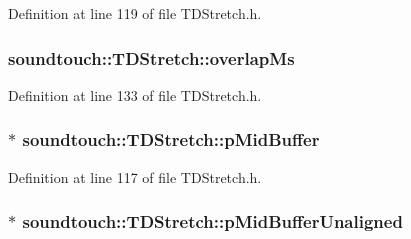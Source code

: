 Definition at line 119 of file T\+D\+Stretch.\+h.

\subsubsection[{\texorpdfstring{overlap\+Ms}{overlapMs}}]{ soundtouch\+::\+T\+D\+Stretch\+::overlap\+Ms\hspace{0.3cm}{\ttfamily [protected]}}\hypertarget{classsoundtouch_1_1_t_d_stretch_a8c3185aed01ad4714c68ef0f3947769d}{}\label{classsoundtouch_1_1_t_d_stretch_a8c3185aed01ad4714c68ef0f3947769d}


Definition at line 133 of file T\+D\+Stretch.\+h.

\subsubsection[{\texorpdfstring{p\+Mid\+Buffer}{pMidBuffer}}]{$\ast$ soundtouch\+::\+T\+D\+Stretch\+::p\+Mid\+Buffer\hspace{0.3cm}{\ttfamily [protected]}}\hypertarget{classsoundtouch_1_1_t_d_stretch_ae8ecce9c1a28ac0e281413ab2d1ffff8}{}\label{classsoundtouch_1_1_t_d_stretch_ae8ecce9c1a28ac0e281413ab2d1ffff8}


Definition at line 117 of file T\+D\+Stretch.\+h.

\subsubsection[{\texorpdfstring{p\+Mid\+Buffer\+Unaligned}{pMidBufferUnaligned}}]{$\ast$ soundtouch\+::\+T\+D\+Stretch\+::p\+Mid\+Buffer\+Unaligned\hspace{0.3cm}{\ttfamily [protected]}}\hypertarget{classsoundtouch_1_1_t_d_stretch_a761455426dae783dd29b1a863ff92e32}{}\label{classsoundtouch_1_1_t_d_stretch_a761455426dae783dd29b1a863ff92e32}


